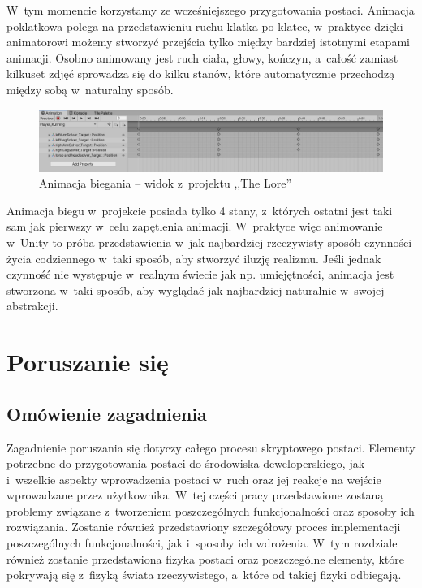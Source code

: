 \documentclass[oneside,polski,logo]{amuthesis}
\begin{document}
\newpage W~tym momencie korzystamy ze wcześniejszego przygotowania postaci. Animacja poklatkowa polega na przedstawieniu ruchu klatka po klatce, w~praktyce dzięki animatorowi możemy stworzyć przejścia tylko między bardziej istotnymi etapami animacji. Osobno animowany jest ruch ciała, głowy, kończyn, a~całość zamiast kilkuset zdjęć sprowadza się do kilku stanów, które automatycznie przechodzą między sobą w~naturalny sposób.

\begin{figure}[h]
	\centering
	\includegraphics[width=13cm]{images/kozubal/runningAnimation.jpg}
	\caption{Animacja biegania – widok z~projektu ,,The Lore''}
\end{figure}

Animacja biegu w~projekcie posiada tylko 4 stany, z~których ostatni jest taki sam jak pierwszy w~celu zapętlenia animacji. W~praktyce więc animowanie w~Unity to próba przedstawienia w~jak najbardziej rzeczywisty sposób czynności życia codziennego w~taki sposób, aby stworzyć iluzję realizmu. Jeśli jednak czynność nie występuje w~realnym świecie jak np. umiejętności, animacja jest stworzona w~taki sposób, aby wyglądać jak najbardziej naturalnie w~swojej abstrakcji.

\section{Poruszanie się}
\subsection{Omówienie zagadnienia}
Zagadnienie poruszania się dotyczy całego procesu skryptowego postaci. Elementy potrzebne do przygotowania postaci do środowiska deweloperskiego, jak i~wszelkie aspekty wprowadzenia postaci w~ruch oraz jej reakcje na wejście wprowadzane przez użytkownika. W~tej części pracy przedstawione zostaną problemy związane z~tworzeniem poszczególnych funkcjonalności oraz sposoby ich rozwiązania. Zostanie również przedstawiony szczegółowy proces implementacji poszczególnych funkcjonalności, jak i~sposoby ich wdrożenia. W~tym rozdziale również zostanie przedstawiona fizyka postaci oraz poszczególne elementy, które pokrywają się z~fizyką świata rzeczywistego, a~które od takiej fizyki odbiegają.
\end{document}

